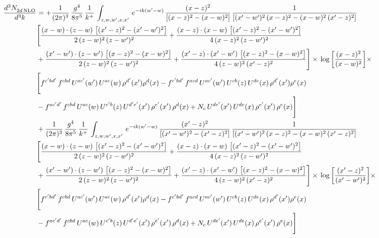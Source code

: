 \documentclass[9pt]{article}
\numberwithin{equation}{section}
\begin{document}
\begin{align}
 \frac{d^{3}N_{2d\,\rm NLO}^{\rm}}{d^{3}k}  & =   +\frac{1}{(2\pi)^{3}}\, \frac{g^{4}}{8\pi^{5}}\,\frac{1}{k^{+}}\,\int_{z,w,w^{\prime},x,x'}\, e^{-ik(w^{\prime}-w)}\,\frac{(x-z)^{2}}{\left[(x-z)^{2}-(x-w)^{2}\right]}\,\frac{1}{\left[(x'-w')^{2}\,(x-z)^{2} - (x-w)^{2}\,(x'-z)^{2}\right]}\notag \\ & \Bigg[\frac{(x-w)\cdot (z-w)\, \left[(x'-z)^{2}-(x'-w')^{2}\right]}{2\, (z-w)^{2}\, (z-w')^{2}}  + \frac{(x-z)\cdot (x-w)\,\left[(x'-z)^{2}-(x'-w')^{2}\right] }{4\,(x-z)^{2}\,(z-w')^{2}}\notag \\ & +\frac{(x'-w')\cdot (z-w')\, \left[(x-z)^{2}-(x-w)^{2}\right]}{2\, (z-w)^{2}\, (z-w')^{2}}+ \frac{(x'-z)\cdot (x'-w')\, \left[(x-z)^{2}-(x-w)^{2}\right]}{4\, (z-w)^{2}\,(x'-z)^{2}}\Bigg]\times\, \log{\left[\frac{(x-z)^{2}}{(x-w)^{2}}\right]} \times\notag \\ & \Bigg[f^{c'bd'}\,f^{cbd}\, U^{ac'}(w')\,U^{ac}(w)\,\rho^{d'}(x')\rho^{d}(x)- f^{c'bd'}\,f^{acd}\,U^{ac'}(w')\,U^{cb}(z)\,U^{de}(x)\,\rho^{d'}(x')\rho^{e}(x) \notag \\ & -f^{ac'd'}\,f^{cbd}\,U^{ac}(w)\,U^{c'b}(z)\,U^{d'e'}(x')\,\rho^{e'}(x')\,\rho^{d}(x) +N_{c}\,U^{de'}(x')\,U^{de}(x)\,\rho^{e'}(x')\,\rho^{e}(x)\Bigg] \notag \\
& +\frac{1}{(2\pi)^{3}}\, \frac{g^{4}}{8\pi^{5}}\,\frac{1}{k^{+}}\,\int_{z,w,w^{\prime},x,x'}\, e^{-ik(w^{\prime}-w)}\,\frac{(x'-z)^{2}}{\left[(x'-w')^{2}-(x'-z)^{2}\right]}\,\frac{1}{\left[(x'-w')^{2}\,(x-z)^{2} - (x-w)^{2}\,(x'-z)^{2}\right]}\notag \\ & \Bigg[\frac{(x-w)\cdot (z-w)\, \left[(x'-z)^{2}-(x'-w')^{2}\right]}{2\, (z-w)^{2}\, (z-w')^{2}}  + \frac{(x-z)\cdot (x-w)\,\left[(x'-z)^{2}-(x'-w')^{2}\right] }{4\,(x-z)^{2}\,(z-w')^{2}}\notag \\ & +\frac{(x'-w')\cdot (z-w')\, \left[(x-z)^{2}-(x-w)^{2}\right]}{2\, (z-w)^{2}\, (z-w')^{2}}+ \frac{(x'-z)\cdot (x'-w')\, \left[(x-z)^{2}-(x-w)^{2}\right]}{4\, (z-w)^{2}\,(x'-z)^{2}}\Bigg]\times\, \log{\left[\frac{(x'-z)^{2}}{(x'-w')^{2}}\right]} \times\notag \\ & \Bigg[f^{c'bd'}\,f^{cbd}\, U^{ac'}(w')\,U^{ac}(w)\,\rho^{d'}(x')\rho^{d}(x)- f^{c'bd'}\,f^{acd}\,U^{ac'}(w')\,U^{cb}(z)\,U^{de}(x)\,\rho^{d'}(x')\rho^{e}(x) \notag \\ & -f^{ac'd'}\,f^{cbd}\,U^{ac}(w)\,U^{c'b}(z)\,U^{d'e'}(x')\,\rho^{e'}(x')\,\rho^{d}(x) +N_{c}\,U^{de'}(x')\,U^{de}(x)\,\rho^{e'}(x')\,\rho^{e}(x)\Bigg]
\end{align}
\end{document}

